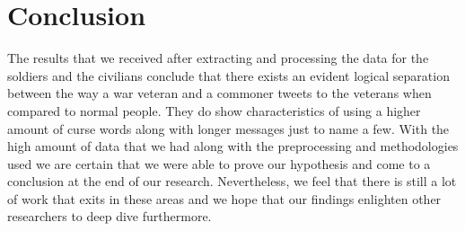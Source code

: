 \section{Conclusion}

The results that we received after extracting and processing the data for the soldiers and the civilians conclude that there exists an evident logical separation between the way a war veteran and a commoner tweets to the veterans when compared to normal people. They do show characteristics of using a higher amount of curse words along with longer messages just to name a few. With the high amount of data that we had along with the preprocessing and methodologies used we are certain that we were able to prove our hypothesis and come to a conclusion at the end of our research. Nevertheless, we feel that there is still a lot of work that exits in these areas and we hope that our findings enlighten other researchers to deep dive furthermore.
